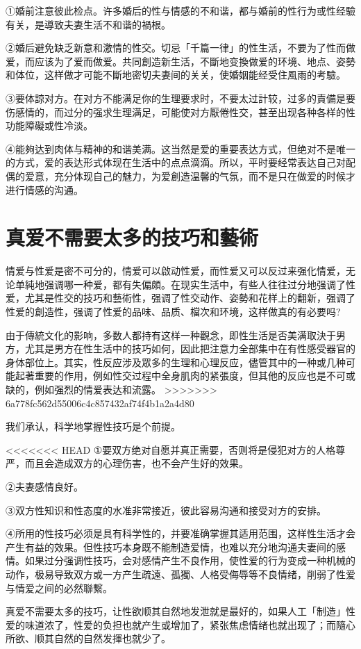 \documentclass[12pt,UTF8]{ctexbook}
\begin{document}
①婚前注意彼此检点。许多婚后的性与情感的不和谐，都与婚前的性行为或性经驗有关，是導致夫妻生活不和谐的禍根。

②婚后避免缺乏新意和激情的性交。切忌「千篇一律」的性生活，不要为了性而做爱，而应该为了爱而做爱。共同創造新生活，不斷地变換做爱的环境、地点、姿勢和体位，这样做才可能不斷地密切夫妻间的关关，使婚姻能经受住風雨的考驗。

③要体諒对方。在对方不能满足你的生理要求时，不要太过計较，过多的責備是要伤感情的，而过分的强求生理满足，可能使对方厭倦性交，甚至出现各种各样的性功能障礙或性冷淡。

④能夠达到肉体与精神的和谐美满。这当然是爱的重要表达方式，但绝对不是唯一的方式，爱的表达形式体现在生活中的点点滴滴。所以，平时要经常表达自己对配偶的爱意，充分体现自己的魅力，为爱創造温馨的气氛，而不是只在做爱的时候才进行情感的沟通。

\section{真爱不需要太多的技巧和藝術}

情爱与性爱是密不可分的，情爱可以啟动性爱，而性爱又可以反过来强化情爱，无论单純地强调哪一种爱，都有失偏頗。在现实生活中，有些人往往过分地强调了性爱，尤其是性交的技巧和藝術性，强调了性交动作、姿勢和花样上的翻新，强调了性爱的創造性，强调了性爱的品味、品质、檔次和环境，这样做真的有必要吗?

由于傳統文化的影响，多数人都持有这样一种觀念，即性生活是否美满取決于男方，尤其是男方在性生活中的技巧如何，因此把注意力全部集中在有性感受器官的身体部位上。其实，性反应涉及眾多的生理和心理反应，儘管其中的一种或几种可能起著重要的作用，例如性交过程中全身肌肉的紧張度，但其他的反应也是不可或缺的，例如强烈的情爱表达和流露。
>>>>>>> 6a778fc562d55006c4c857432af74f4b1a2a4d80

我们承认，科学地掌握性技巧是个前提。

<<<<<<< HEAD
①要双方绝对自愿并真正需要，否则将是侵犯对方的人格尊严，而且会造成双方的心理伤害，也不会产生好的效果。

②夫妻感情良好。

③双方性知识和性态度的水准非常接近，彼此容易沟通和接受对方的安排。

④所用的性技巧必须是具有科学性的，并要准确掌握其适用范围，这样性生活才会产生有益的效果。但性技巧本身既不能制造爱情，也难以充分地沟通夫妻间的感情。如果过分强调性技巧，会对感情产生不良作用，使性爱的行为变成一种机械的动作，极易导致双方或一方产生疏遠、孤獨、人格受侮辱等不良情绪，削弱了性爱与情爱之间的必然聯繫。

真爱不需要太多的技巧，让性欲顺其自然地发泄就是最好的，如果人工「制造」性爱的味道浓了，性爱的负担也就产生或增加了，紧张焦虑情绪也就出现了；而隨心所欲、顺其自然的自然发揮也就少了。
\end{document}
